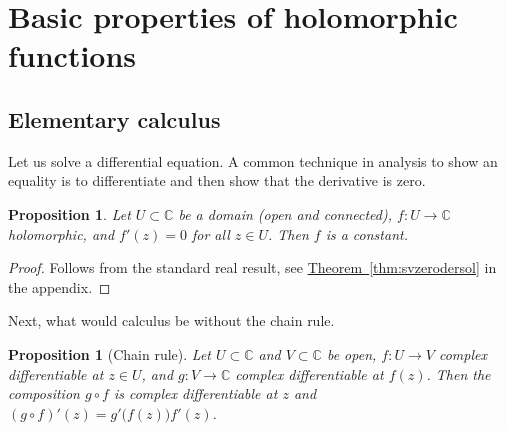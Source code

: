 \documentclass[12pt,openany]{book}
\newcommand{\C}{{\mathbb{C}}}
\theoremstyle{plain}
\newtheorem{prop}[thm]{Proposition}
\theoremstyle{remark}
\theoremstyle{definition}
\theoremstyle{exercise}
\theoremstyle{example}
\newcommand{\thmref}[1]{\hyperref[#1]{Theorem~\ref*{#1}}}
\begin{document}

\section{Basic properties of holomorphic functions}

\subsection{Elementary calculus}

Let us solve a differential equation.  A common technique in analysis
to show an equality is to differentiate and then show that the derivative is
zero.

\begin{prop} \label{prop:zeroder}
Let $U \subset \C$ be a domain (open and connected),
$f \colon U \to \C$ holomorphic, and $f'(z) = 0$ for all $z \in U$.
Then $f$ is a constant.
\end{prop}

\begin{proof}
Follows from the standard real result,
see \thmref{thm:svzerodersol} in the appendix.
\end{proof}

Next, what would calculus be without the chain rule.

\begin{prop}[Chain rule] 
Let $U \subset \C$ and $V \subset \C$ be open, $f \colon U \to V$
complex differentiable at $z \in U$, and $g \colon V \to \C$ complex differentiable
at $f(z)$.  Then the composition $g \circ f$
is complex differentiable at $z$ and $(g \circ f)'(z) = g'\bigl(f(z)\bigr) f'(z)$.
\end{prop}
\end{document}
